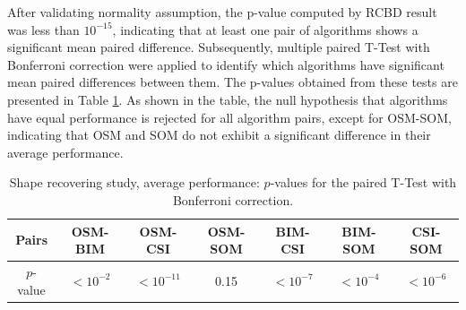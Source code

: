 \documentclass{IEEEtran}
\begin{document}
                After validating normality assumption, the p-value computed by RCBD result was less than $10^{-15}$, indicating that at least one pair of algorithms shows a significant mean paired difference. Subsequently, multiple paired T-Test with Bonferroni correction were applied to identify which algorithms have significant mean paired differences between them. The p-values obtained from these tests are presented in Table \ref{tab:shape:average:pvalue}. As shown in the table, the null hypothesis that algorithms have equal performance is rejected for all algorithm pairs, except for OSM-SOM, indicating that OSM and SOM do not exhibit a significant difference in their average performance.

                \begin{table}
                    \centering
                    \renewcommand{\arraystretch}{1.5}
                    \caption{Shape recovering study, average performance: $p$-values for the paired T-Test with Bonferroni correction.}
                    \label{tab:shape:average:pvalue}
                    \begin{tabular}{ccccccc}
                        Pairs & OSM-BIM & OSM-CSI & OSM-SOM & BIM-CSI & BIM-SOM & CSI-SOM \\\hline
                        $p$-value & $<10^{-2}$ & $<10^{-11}$ & 0.15 & $<10^{-7}$ & $<10^{-4}$ & $<10^{-6}$ \\  
                    \end{tabular}
                \end{table}

\end{document}

